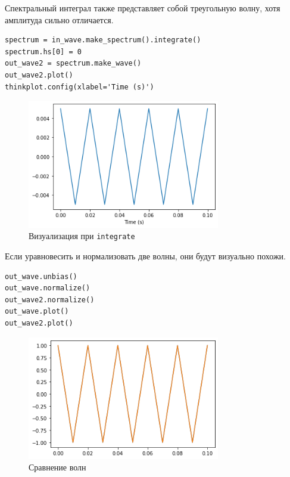 \documentclass[a4paper,12pt]{report}
\begin{document}
Спектральный интеграл также представляет собой треугольную волну, хотя амплитуда сильно отличается.

\begin{lstlisting}[caption=Визуализация при \texttt{integrate}]
spectrum = in_wave.make_spectrum().integrate()
spectrum.hs[0] = 0
out_wave2 = spectrum.make_wave()
out_wave2.plot()
thinkplot.config(xlabel='Time (s)')
\end{lstlisting}

\begin{figure}[H]
        \centering
        \includegraphics[width=0.75\textwidth]{lab9_fig3_3.png}
        \caption{Визуализация при \texttt{integrate}}
        \label{fig:lab9_fig3_3}
\end{figure}

Если уравновесить и нормализовать две волны, они будут визуально похожи.

\begin{lstlisting}[caption=Сравнение волн]
out_wave.unbias()
out_wave.normalize()
out_wave2.normalize()
out_wave.plot()
out_wave2.plot()
\end{lstlisting}

\begin{figure}[H]
        \centering
        \includegraphics[width=0.75\textwidth]{lab9_fig3_4.png}
        \caption{Сравнение волн}
        \label{fig:lab9_fig3_4}
\end{figure}
\end{document}
